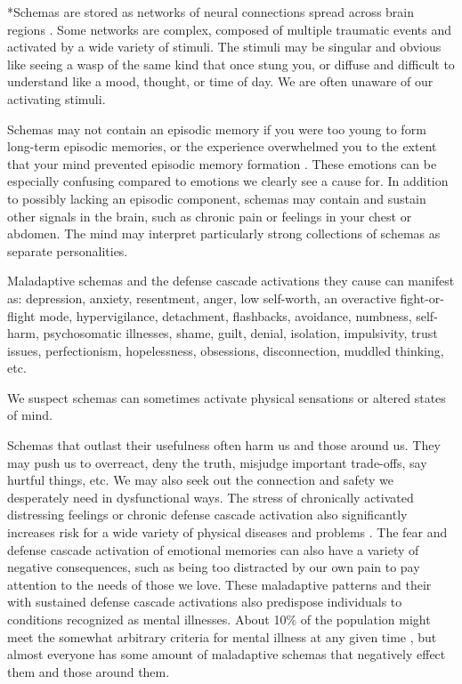 \documentclass[12pt,letterpaper]{book}
\begin{document}
*Schemas are stored as networks of neural connections spread across brain regions \cite{eckerUnlocking}. Some networks are complex, composed of multiple traumatic events and activated by a wide variety of stimuli. The stimuli may be singular and obvious like seeing a wasp of the same kind that once stung you, or diffuse and difficult to understand like a mood, thought, or time of day. We are often unaware of our activating stimuli.

Schemas may not contain an episodic memory if you were too young to form long-term episodic memories, or the experience overwhelmed you to the extent that your mind prevented episodic memory formation \cite{vanderKolkBody,brownAttachmentDisturbances}. These emotions can be especially confusing compared to emotions we clearly see a cause for. In addition to possibly lacking an episodic component, schemas may contain and sustain other signals in the brain, such as chronic pain or feelings in your chest or abdomen. The mind may interpret particularly strong collections of schemas as separate personalities.

Maladaptive schemas and the defense cascade activations they cause can manifest as: depression, anxiety, resentment, anger, low self-worth, an overactive fight-or-flight mode, hypervigilance, detachment, flashbacks, avoidance, numbness, self-harm, psychosomatic illnesses, shame, guilt, denial, isolation, impulsivity, trust issues, perfectionism, hopelessness, obsessions, disconnection, muddled thinking, etc. 

We suspect schemas can sometimes activate physical sensations or altered states of mind.

Schemas that outlast their usefulness often harm us and those around us. They may push us to overreact, deny the truth, misjudge important trade-offs, say hurtful things, etc. We may also seek out the connection and safety we desperately need in dysfunctional ways. The stress of chronically activated distressing feelings or chronic defense cascade activation also significantly increases risk for a wide variety of physical diseases and problems \cite{felittiACE}.  The fear and defense cascade activation of emotional memories can also have a variety of negative consequences, such as being too distracted by our own pain to pay attention to the needs of those we love. These maladaptive patterns and their with sustained defense cascade activations also predispose individuals to conditions recognized as mental illnesses. About 10\% of the population might meet the somewhat arbitrary criteria for mental illness at any given time \cite{whoMentalHealth}, but almost everyone has some amount of maladaptive schemas that negatively effect them and those around them.
\end{document}
